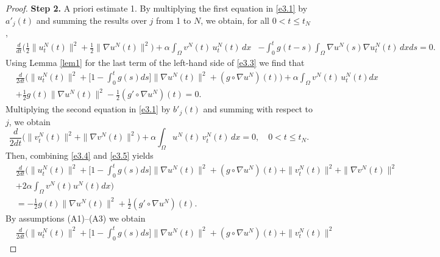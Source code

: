 \begin{proof}
\noindent\textbf{Step 2.} A priori estimate 1.
By multiplying the first equation in \eqref{e3.1} by \(a'_j(t)\) and summing the results over \(j\)
from 1 to \(N\), we obtain, for all \(0 < t \leq t_N\),
\begin{equation}
\begin{aligned}
&\frac{d}{dt} \Big( \frac{1}{2} \| u^N_{t}(t) \|^2 + \frac{1}{2} \| \nabla u^N(t) \|^2 \Big)
+ \alpha \int_{\Omega} v^N(t) \, u^N_{t}(t) \, dx
&- \int_0^t g(t-s) \int_{\Omega} \nabla u^N(s) \nabla u^N_{t}(t) \, dx ds =0.
\end{aligned}\label{e3.3}
\end{equation}
Using Lemma \ref{lem1} for the last term of the left-hand side of \eqref{e3.3}
we find that
\begin{equation}
\begin{aligned}
&\frac{d}{2dt} \Big( \| u^N_{t}(t) \|^2
+ \Big[ 1-\int_0^t g(s) ds \Big] \| \nabla u^N(t) \|^2 + (g\circ \nabla u^N)(t) \Big)
+\alpha \int_{\Omega} v^N(t) \, u^N_{t}(t) dx \\
& +\frac{1}{2} g(t)\parallel \nabla u^N(t) \parallel^2 - \frac{1}{2}( g'\circ\nabla u^N) (t) =0.
\end{aligned} \label{e3.4}
 \end{equation}
Multiplying the second equation in \eqref{e3.1} by $b'_j(t)$ and summing with respect to $j$, we obtain
 \begin{equation}
 \frac{d}{2 dt} \Big( \| v^N_{t}(t) \|^2 + \| \nabla v^N (t) \|^2 \Big)
 + \alpha \int_{\Omega} u^N(t) \, v^N_{t}(t) \, dx =0, \quad 0 < t \leq t_N.
 \label{e3.5}
\end{equation}
Then, combining \eqref{e3.4} and \eqref{e3.5} yields
\begin{equation}
\begin{aligned}
 &\frac{d}{2 dt} \Big( \| u^N_{t}(t) \|^2 + \Big[ 1-\int_0^t g(s)ds\Big]
 \| \nabla u^N(t) \|^2 +(g\circ\nabla u^N)(t)+\| v^N_{t}(t) \|^2 + \| \nabla v^N(t) \|^2 \\
 &+ 2 \alpha \int_{\Omega} v^N(t) u^N(t) dx\Big) \\
&=-\frac{1}{2} g(t)\parallel \nabla u^N(t) \parallel^2 + \frac{1}{2}( g'\circ\nabla u^N )(t).
\end{aligned}\label{e3.6}
\end{equation}
By assumptions (A1)--(A3) we obtain
 \begin{equation}
\begin{aligned}
&\frac{d}{2 dt} \Big( \| u^N_{t} (t) \|^2 + \Big[ 1-\int_0^t g(s)ds\Big]
 \| \nabla u^N(t) \|^2 +(g\circ\nabla u^N)(t)+\| v^N_{t}(t) \|^2

\end{aligned}
\end{equation}
\end{proof}
